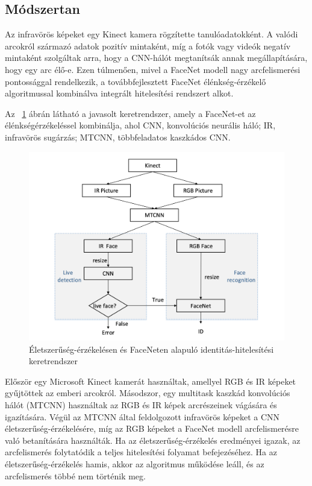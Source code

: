 \subsection{Módszertan}

Az infravörös képeket egy Kinect kamera rögzítette tanulóadatokként. A valódi arcokról származó adatok pozitív mintaként, míg a fotók vagy videók negatív mintaként szolgáltak arra, hogy a CNN-hálót megtanítsák annak megállapítására, hogy egy arc élő-e. Ezen túlmenően, mivel a FaceNet modell nagy arcfelismerési pontossággal rendelkezik, a továbbfejlesztett FaceNet élénkség-érzékelő algoritmussal kombinálva integrált hitelesítési rendszert alkot.

Az ~\ref{fig:face3} ábrán látható a javasolt keretrendszer, amely a FaceNet-et az élénkségérzékeléssel kombinálja, ahol CNN, konvolúciós neurális háló;  IR, infravörös sugárzás; MTCNN, többfeladatos kaszkádos CNN.


\begin{figure}[htbp]
	\includegraphics[width=\textwidth]{figures/live_rec.png}
	\caption{Életszerűség-érzékelésen és FaceNeten alapuló identitás-hitelesítési keretrendszer \cite{18}}
	\label{fig:face3}
\end{figure}

Először egy Microsoft Kinect kamerát használtak, amellyel RGB és IR képeket gyűjtöttek az emberi arcokról. Másodszor, egy multitask kaszkád konvolúciós hálót (MTCNN) használtak az RGB és IR képek arcrészeinek vágására és igazítására. Végül az MTCNN által feldolgozott infravörös képeket a CNN életszerűség-érzékelésére, míg az RGB képeket a FaceNet modell arcfelismerésre való betanítására használták. Ha az életszerűség-érzékelés eredményei igazak, az arcfelismerés folytatódik a teljes hitelesítési folyamat befejezéséhez. Ha az életszerűség-érzékelés hamis, akkor az algoritmus működése leáll, és az arcfelismerés többé nem történik meg.

